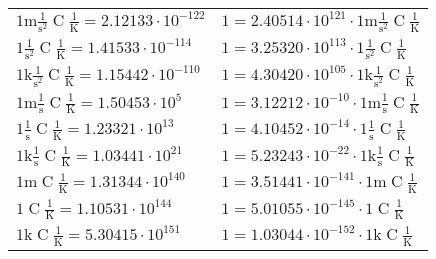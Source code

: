 \begin{center}
\begin{longtable}{l l}
{\color{gray}$1 \bm{\mathrm{ m}}{}\frac1{\operatorname{s}^2}{\operatorname{C}}\frac1{\operatorname{K}} = 2.12133\cdot10^{-122} $}   & {\color{gray}$ 1 = 2.40514\cdot10^{121} \cdot 1 \bm{\mathrm{ m}}{}\frac1{\operatorname{s}^2}{\operatorname{C}}\frac1{\operatorname{K}}$}  \\
{\color{black}$1 \bm{\mathrm{ }}{}\frac1{\operatorname{s}^2}{\operatorname{C}}\frac1{\operatorname{K}} = 1.41533\cdot10^{-114} $}   & {\color{black}$ 1 = 3.25320\cdot10^{113} \cdot 1 \bm{\mathrm{ }}{}\frac1{\operatorname{s}^2}{\operatorname{C}}\frac1{\operatorname{K}}$}  \\
{\color{gray}$1 \bm{\mathrm{ k}}{}\frac1{\operatorname{s}^2}{\operatorname{C}}\frac1{\operatorname{K}} = 1.15442\cdot10^{-110} $}   & {\color{gray}$ 1 = 4.30420\cdot10^{105} \cdot 1 \bm{\mathrm{ k}}{}\frac1{\operatorname{s}^2}{\operatorname{C}}\frac1{\operatorname{K}}$}  \\
{\color{gray}$1 \bm{\mathrm{ m}}{}\frac1{\operatorname{s}}{\operatorname{C}}\frac1{\operatorname{K}} = 1.50453\cdot10^{5} $}   & {\color{gray}$ 1 = 3.12212\cdot10^{-10} \cdot 1 \bm{\mathrm{ m}}{}\frac1{\operatorname{s}}{\operatorname{C}}\frac1{\operatorname{K}}$}  \\
{\color{black}$1 \bm{\mathrm{ }}{}\frac1{\operatorname{s}}{\operatorname{C}}\frac1{\operatorname{K}} = 1.23321\cdot10^{13} $}   & {\color{black}$ 1 = 4.10452\cdot10^{-14} \cdot 1 \bm{\mathrm{ }}{}\frac1{\operatorname{s}}{\operatorname{C}}\frac1{\operatorname{K}}$}  \\
{\color{gray}$1 \bm{\mathrm{ k}}{}\frac1{\operatorname{s}}{\operatorname{C}}\frac1{\operatorname{K}} = 1.03441\cdot10^{21} $}   & {\color{gray}$ 1 = 5.23243\cdot10^{-22} \cdot 1 \bm{\mathrm{ k}}{}\frac1{\operatorname{s}}{\operatorname{C}}\frac1{\operatorname{K}}$}  \\
{\color{gray}$1 \bm{\mathrm{ m}}{}{}{\operatorname{C}}\frac1{\operatorname{K}} = 1.31344\cdot10^{140} $}   & {\color{gray}$ 1 = 3.51441\cdot10^{-141} \cdot 1 \bm{\mathrm{ m}}{}{}{\operatorname{C}}\frac1{\operatorname{K}}$}  \\
{\color{black}$1 \bm{\mathrm{ }}{}{}{\operatorname{C}}\frac1{\operatorname{K}} = 1.10531\cdot10^{144} $}   & {\color{black}$ 1 = 5.01055\cdot10^{-145} \cdot 1 \bm{\mathrm{ }}{}{}{\operatorname{C}}\frac1{\operatorname{K}}$}  \\
{\color{gray}$1 \bm{\mathrm{ k}}{}{}{\operatorname{C}}\frac1{\operatorname{K}} = 5.30415\cdot10^{151} $}   & {\color{gray}$ 1 = 1.03044\cdot10^{-152} \cdot 1 \bm{\mathrm{ k}}{}{}{\operatorname{C}}\frac1{\operatorname{K}}$}  \\

\end{longtable}
\end{center}
